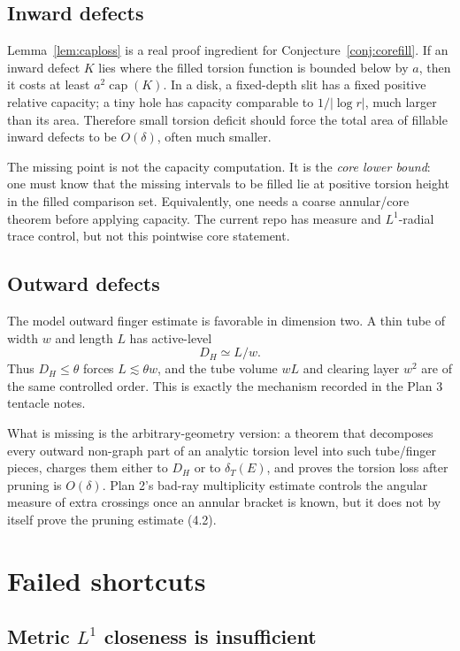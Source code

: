 \documentclass[11pt]{article}
\newcommand{\dT}{\delta_T}
\newcommand{\capr}{\operatorname{cap}}
\begin{document}
\subsection{Inward defects}

Lemma~\ref{lem:caploss} is a real proof ingredient for
Conjecture~\ref{conj:corefill}.  If an inward defect \(K\) lies where
the filled torsion function is bounded below by \(a\), then it costs at
least \(a^2\capr(K)\).  In a disk, a fixed-depth slit has a fixed
positive relative capacity; a tiny hole has capacity comparable to
\(1/|\log r|\), much larger than its area.  Therefore small torsion
deficit should force the total area of fillable inward defects to be
\(O(\delta)\), often much smaller.

The missing point is not the capacity computation.  It is the
\emph{core lower bound}: one must know that the missing intervals to be
filled lie at positive torsion height in the filled comparison set.
Equivalently, one needs a coarse annular/core theorem before applying
capacity.  The current repo has measure and \(L^1\)-radial trace
control, but not this pointwise core statement.

\subsection{Outward defects}

The model outward finger estimate is favorable in dimension two.  A
thin tube of width \(w\) and length \(L\) has active-level
\[
   D_H\simeq L/w .
\]
Thus \(D_H\le\theta\) forces \(L\lesssim\theta w\), and the tube volume
\(wL\) and clearing layer \(w^2\) are of the same controlled order.
This is exactly the mechanism recorded in the Plan 3 tentacle notes.

What is missing is the arbitrary-geometry version: a theorem that
decomposes every outward non-graph part of an analytic torsion level
into such tube/finger pieces, charges them either to \(D_H\) or to
\(\dT(E)\), and proves the torsion loss after pruning is \(O(\delta)\).
Plan 2's bad-ray multiplicity estimate controls the angular measure of
extra crossings once an annular bracket is known, but it does not by
itself prove the pruning estimate (4.2).

\section{Failed shortcuts}

\subsection{Metric \(L^1\) closeness is insufficient}
\end{document}

